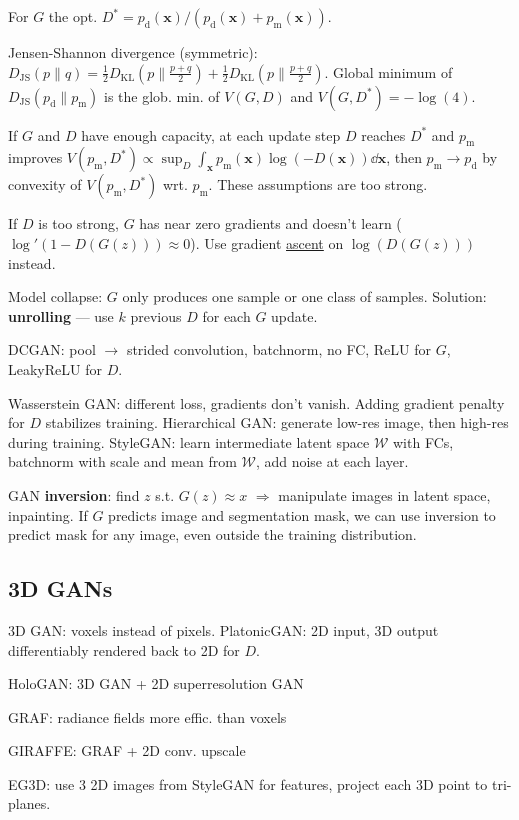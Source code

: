 \documentclass[11pt,landscape,a4paper,fleqn]{article}
\newcommand{\kl}[2]{D_{\mathrm{KL}}(#1\lVert#2)}
\newcommand{\js}[2]{D_{\mathrm{JS}}(#1\lVert#2)}
\def\myvector#1{\mathbf{#1}}
\def\vx{{\myvector{x}}}
\begin{document}
\begin{multicols*}{4}
For $G$ the opt. $D^* = p_{\mathrm{d}}(\vx) / (p_{\mathrm{d}}(\vx) + p_{\mathrm{m}}(\vx))$.

Jensen-Shannon divergence (symmetric):
$\js{p}{q} = \frac{1}{2} \kl{p}{\frac{p + q}{2}} + \frac{1}{2} \kl{p}{\frac{p + q}{2}}$.
Global minimum of $\js{p_{\mathrm{d}}}{p_{\mathrm{m}}}$ is the glob. min. of $V(G, D)$
and $V(G, D^*) = - \log(4)$.

If $G$ and $D$ have enough capacity, at each update step $D$ reaches $D^*$
and $p_{\mathrm{m}}$ improves $V(p_{\mathrm{m}}, D^*) \propto \sup_D \int_{\vx} p_{\mathrm{m}}(\vx) \log( - D(\vx)) \dd \vx$,
then $p_{\mathrm{m}} \to p_{\mathrm{d}}$ by convexity of $V(p_{\mathrm{m}}, D^*)$ wrt. $p_{\mathrm{m}}$.
These assumptions are too strong.

If $D$ is too strong, $G$ has near zero gradients and doesn't learn ($\log'(1 - D(G(z))) \approx 0$).
Use gradient \underline{ascent} on $\log(D(G(z)))$ instead.

Model collapse: $G$ only produces one sample or one class of samples.
Solution: \textbf{unrolling} --- use $k$ previous $D$ for each $G$ update.

DCGAN: pool $\to$ strided convolution, batchnorm, no FC, ReLU for $G$, LeakyReLU for $D$.

Wasserstein GAN: different loss, gradients don't vanish.
Adding gradient penalty for $D$ stabilizes training.
Hierarchical GAN: generate low-res image, then high-res during training.
StyleGAN: learn intermediate latent space $\mathcal{W}$ with FCs,
batchnorm with scale and mean from $\mathcal{W}$, add noise at each layer.

GAN \textbf{inversion}: find $z$ s.t. $G(z) \approx x$ $ \Rightarrow $ manipulate images in latent space, inpainting.
If $G$ predicts image and segmentation mask,
we can use inversion to predict mask for any image, even outside the training distribution.

\subsection{3D GANs}

3D GAN: voxels instead of pixels.
PlatonicGAN: 2D input, 3D output differentiably rendered back to 2D for $D$.

HoloGAN: 3D GAN + 2D superresolution GAN

GRAF: radiance fields more effic. than voxels

GIRAFFE: GRAF + 2D conv. upscale

EG3D: use 3 2D images from StyleGAN for features, project each 3D point to tri-planes.


\end{multicols*}
\end{document}

